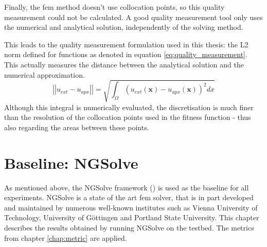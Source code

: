 \documentclass[./\jobname.tex]{subfiles}
\begin{document}
\begin{figure}[H]
	\centering
	\noindent{}
	\label{fig:aliasing error}
\end{figure}

Finally, the \gls{fem} method doesn't use collocation points, so this quality measurement could not be calculated. A good quality measurement tool only uses the numerical and analytical solution, independently of the solving method. 

This leads to the quality measurement formulation used in this thesis: the L2 norm defined for functions as denoted in equation \eqref{eq:quality_measurement}. This actually measures the distance between the analytical solution and the numerical approximation.  
\begin{equation}
\label{eq:quality_measurement}
\left|\left|u_{ext} - u_{apx}\right|\right| = \sqrt{\int_{\Omega} (u_{ext}(\mathbf{x}) - u_{apx}(\mathbf{x}))^2 dx}
\end{equation}
Although this integral is numerically evaluated, the discretisation is much finer than the resolution of the collocation points used in the fitness function - thus also regarding the areas between these points.



\section{Baseline: NGSolve}
\label{chap:fem_baseline_results}
As mentioned above, the NGSolve framework (\cite{schoberl_ngsolvengsolve_2020}) is used as the baseline for all experiments. NGSolve is a state of the art \gls{fem} solver, that is in part developed and maintained by numerous well-known institutes such as Vienna University of Technology, University of Göttingen and Portland State University. This chapter describes the results obtained by running NGSolve on the testbed. The metrics from chapter \ref{chap:metric} are applied. 
\end{document}
